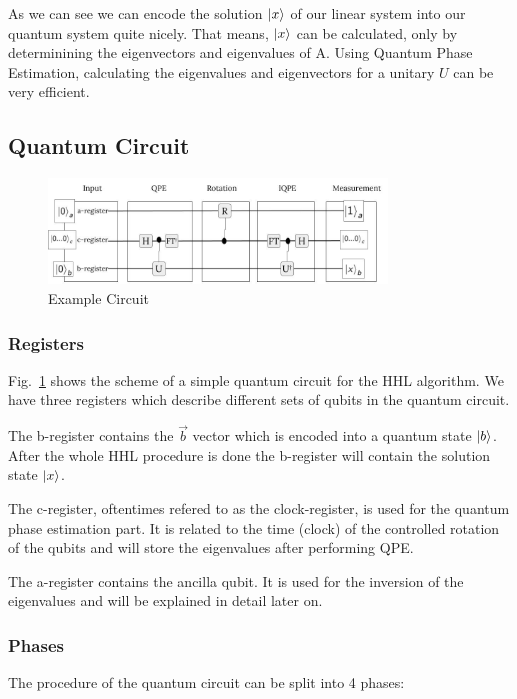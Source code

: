 As we can see we can encode the solution $\ket x$ of our linear system into our quantum system quite nicely.
That means, $\ket x$ can be calculated, only by determinining the eigenvectors and eigenvalues of A. 
Using Quantum Phase Estimation, calculating the eigenvalues and eigenvectors for a unitary $U$ can be very efficient.



\subsection{Quantum Circuit}


\begin{figure}
    \centering
    \includegraphics[width=9.0cm]{img/example_circuit_cropped.png}
    \caption{Example Circuit}
    \label{ex_circ}
\end{figure}


\subsubsection{Registers}
Fig.~\ref{ex_circ} shows the scheme of a simple quantum circuit for the HHL algorithm.
We have three registers which describe different sets of qubits in the quantum circuit.

The b-register contains the $\vec{b}$ vector which is encoded into a quantum state $\ket{b}$. 
After the whole HHL procedure is done the b-register will contain the solution state $\ket{x}$.

The c-register, oftentimes refered to as the clock-register, is used for the quantum phase estimation part. It is related to the time (clock) of the controlled rotation of the qubits and will store the eigenvalues after performing QPE.

The a-register contains the ancilla qubit. It is used for the inversion of the eigenvalues and will be explained in detail later on.

\subsubsection{Phases}
The procedure of the quantum circuit can be split into 4 phases:

